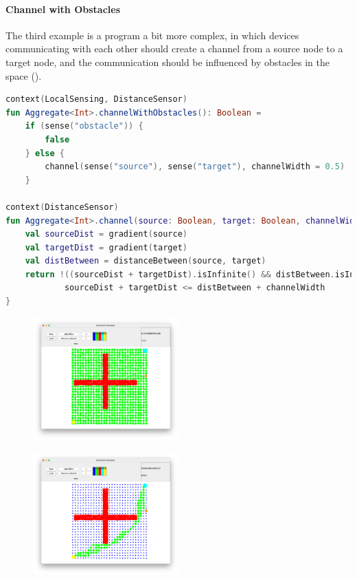 \paragraph{Channel with Obstacles}
The third example is a program a bit more complex, in which devices communicating with each other should create a channel
from a source node to a target node, and the communication should be influenced by obstacles in the space ().

\begin{lstlisting}[language=kt, caption={Channel with Obstacles code example}, label={lst:channel-with-obstacles-example}]
context(LocalSensing, DistanceSensor)
fun Aggregate<Int>.channelWithObstacles(): Boolean =
    if (sense("obstacle")) {
        false
    } else {
        channel(sense("source"), sense("target"), channelWidth = 0.5)
    }

context(DistanceSensor)
fun Aggregate<Int>.channel(source: Boolean, target: Boolean, channelWidth: Double): Boolean {
    val sourceDist = gradient(source)
    val targetDist = gradient(target)
    val distBetween = distanceBetween(source, target)
    return !((sourceDist + targetDist).isInfinite() && distBetween.isInfinite()) &&
            sourceDist + targetDist <= distBetween + channelWidth
}
\end{lstlisting}

\begin{figure}[ht!]
    \centering
    \includegraphics[width=0.5\textwidth]{figures/channel1}
    \caption{}
    \label{fig:channel1}
\end{figure}

\begin{figure}[ht!]
    \centering
    \includegraphics[width=0.5\textwidth]{figures/channel2}
    \caption{}
    \label{fig:channel2}
\end{figure}

